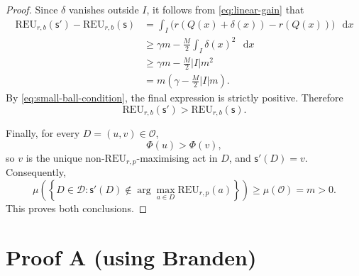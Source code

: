 \documentclass[a4paper,final]{article}
\newcommand\REU{\mathrm{REU}}
\newcommand{\Decs}{\mathcal{D}}
\newcommand\s{\mathsf{s}}
\newcommand*\diff{\mathop{}\!\mathrm{d}}
\renewcommand{\geq}{\geqslant}
\newenvironment{CCM rewritten}
{\begingroup\color{blue}} %
{\endgroup}              %
\begin{document}
\begin{proof}
Since \(\delta\) vanishes outside \(I\), it follows from
\eqref{eq:linear-gain} that
\begin{align}
\REU_{r,b}(\s')-\REU_{r,b}(\s)
&=
\int_I
\bigl(
r(Q(x)+\delta(x))-r(Q(x))
\bigr)
\,\diff x\\
&\geq
\gamma m
-\frac{M}{2}\int_I\delta(x)^2\,\diff x\\
&\geq
\gamma m
-\frac{M}{2}|I|m^2\\
&=
m\left(
\gamma-\frac{M}{2}|I|m
\right).
\end{align}
By \eqref{eq:small-ball-condition}, the final expression is strictly
positive. Therefore
\[
\REU_{r,b}(\s')>\REU_{r,b}(\s).
\]

Finally, for every \(D=(u,v)\in\mathcal O\),
\[
\Phi(u)>\Phi(v),
\]
so \(v\) is the unique non-\(\REU_{r,p}\)-maximising act in \(D\), and
\(\s'(D)=v\). Consequently,
\[
\mu\left(
\left\{
D\in\Decs:
\s'(D)\notin
\arg\max_{a\in D}\REU_{r,p}(a)
\right\}
\right)
\geq
\mu(\mathcal O)
=
m
>
0.
\]
This proves both conclusions.
\end{proof}

\section{Proof A (using Branden)}
\end{document}

